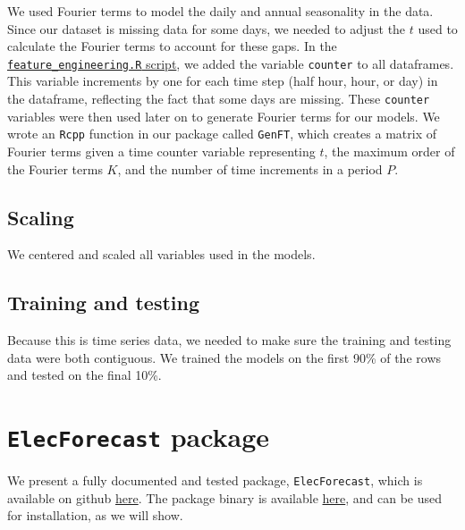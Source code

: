 \documentclass[
]{article}
\begin{document}
We used Fourier terms to model the daily and annual seasonality in the
data. Since our dataset is missing data for some days, we needed to
adjust the \(t\) used to calculate the Fourier terms to account for
these gaps. In the
\href{https://github.com/Shermjj/SC-2-Electric-Boogalo/blob/main/feature_engineering.R}{\texttt{feature\_engineering.R}
script}, we added the variable \texttt{counter} to all dataframes. This
variable increments by one for each time step (half hour, hour, or day)
in the dataframe, reflecting the fact that some days are missing. These
\texttt{counter} variables were then used later on to generate Fourier
terms for our models. We wrote an \texttt{Rcpp} function in our package
called \texttt{GenFT}, which creates a matrix of Fourier terms given a
time counter variable representing \(t\), the maximum order of the
Fourier terms \(K\), and the number of time increments in a period
\(P\).

\hypertarget{scaling}{%
\subsection{Scaling}\label{scaling}}

We centered and scaled all variables used in the models.

\hypertarget{training-and-testing}{%
\subsection{Training and testing}\label{training-and-testing}}

Because this is time series data, we needed to make sure the training
and testing data were both contiguous. We trained the models on the
first 90\% of the rows and tested on the final 10\%.

\hypertarget{elecforecast-package}{%
\section{\texorpdfstring{\texttt{ElecForecast}
package}{ElecForecast package}}\label{elecforecast-package}}

We present a fully documented and tested package, \texttt{ElecForecast},
which is available on github
\href{https://github.com/Shermjj/SC-2-Electric-Boogalo}{here}. The
package binary is available
\href{https://github.com/Shermjj/SC-2-Electric-Boogalo/blob/main/ElecForecast_1.0_R_x86_64-pc-linux-gnu.tar.gz}{here},
and can be used for installation, as we will show.
\end{document}
